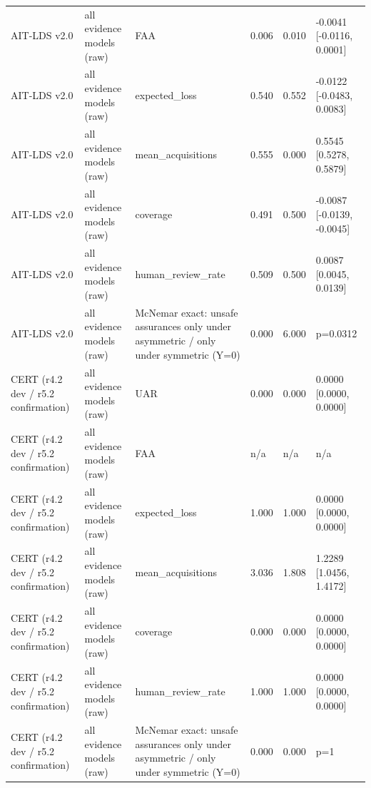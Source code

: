 \begin{table}[!ht]
{\begin{tabular}{llllll}
AIT-LDS v2.0 & all evidence models (raw) & FAA & 0.006 & 0.010 & -0.0041 [-0.0116, 0.0001] \\
AIT-LDS v2.0 & all evidence models (raw) & expected\_loss & 0.540 & 0.552 & -0.0122 [-0.0483, 0.0083] \\
AIT-LDS v2.0 & all evidence models (raw) & mean\_acquisitions & 0.555 & 0.000 & 0.5545 [0.5278, 0.5879] \\
AIT-LDS v2.0 & all evidence models (raw) & coverage & 0.491 & 0.500 & -0.0087 [-0.0139, -0.0045] \\
AIT-LDS v2.0 & all evidence models (raw) & human\_review\_rate & 0.509 & 0.500 & 0.0087 [0.0045, 0.0139] \\
AIT-LDS v2.0 & all evidence models (raw) & McNemar exact: unsafe assurances only under asymmetric / only under symmetric (Y=0) & 0.000 & 6.000 & p=0.0312 \\
CERT (r4.2 dev / r5.2 confirmation) & all evidence models (raw) & UAR & 0.000 & 0.000 & 0.0000 [0.0000, 0.0000] \\
CERT (r4.2 dev / r5.2 confirmation) & all evidence models (raw) & FAA & n/a & n/a & n/a \\
CERT (r4.2 dev / r5.2 confirmation) & all evidence models (raw) & expected\_loss & 1.000 & 1.000 & 0.0000 [0.0000, 0.0000] \\
CERT (r4.2 dev / r5.2 confirmation) & all evidence models (raw) & mean\_acquisitions & 3.036 & 1.808 & 1.2289 [1.0456, 1.4172] \\
CERT (r4.2 dev / r5.2 confirmation) & all evidence models (raw) & coverage & 0.000 & 0.000 & 0.0000 [0.0000, 0.0000] \\
CERT (r4.2 dev / r5.2 confirmation) & all evidence models (raw) & human\_review\_rate & 1.000 & 1.000 & 0.0000 [0.0000, 0.0000] \\
CERT (r4.2 dev / r5.2 confirmation) & all evidence models (raw) & McNemar exact: unsafe assurances only under asymmetric / only under symmetric (Y=0) & 0.000 & 0.000 & p=1 \\
\bottomrule
\end{tabular}}
\end{table}
